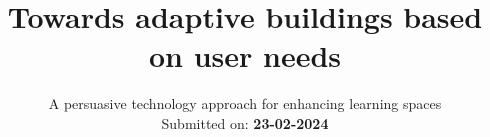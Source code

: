 \title{Towards adaptive buildings based on user needs}
\subtitle{ A persuasive technology approach for enhancing learning spaces \\ Submitted on: \textbf{23-02-2024}}